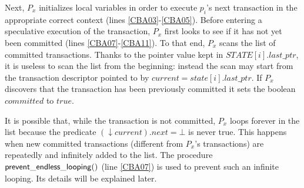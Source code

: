 Next, $P_x$  initializes local  variables in order  to execute  $p_i$'s next
transaction in the appropriate correct context (lines \ref{CBA03}-\ref{CBA05}).
Before entering a speculative  execution of the transaction, 
$P_x$ first looks to see
if it has not yet been committed (lines  \ref{CBA07}-\ref{CBA11}). To that
end,  $P_x$  scans  the list   of  committed transactions.   Thanks to  the
pointer value kept in  $\mathit{STATE}[i].last\_ptr$, it is useless to
scan the list from the beginning:  
instead the scan may start from the transaction 
descriptor pointed to by $current = state[i].last\_ptr$. 
If $P_x$  discovers that the  transaction has been previously  committed it
sets the boolean $committed$ to $\mathit{true}$. 

It is  possible that, while the  transaction is not  committed, $P_x$ loops
forever in the list because the predicate $(\downarrow current).next=\bot$ 
is  never true. This  happens  when  new committed  transactions (different
from $P_x$'s transactions) are repeatedly and infinitely 
added to the list. The procedure  ${\sf prevent\_endless\_looping}()$
(line \ref{CBA07}) is used to prevent such an infinite looping. 
Its details will be  explained  later. 




